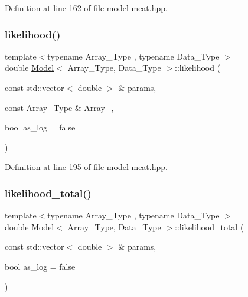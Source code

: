 Definition at line 162 of file model-\/meat.\+hpp.

\mbox{\label{class_model_adf2c30d9c5ffdc87af6813d110146968}} 
\subsubsection{\texorpdfstring{likelihood()}{likelihood()}\hspace{0.1cm}{\footnotesize\ttfamily [2/2]}}
{\footnotesize\ttfamily template$<$typename Array\+\_\+\+Type , typename Data\+\_\+\+Type $>$ \\
double \hyperlink{class_model}{Model}$<$ Array\+\_\+\+Type, Data\+\_\+\+Type $>$\+::likelihood (\begin{DoxyParamCaption}\item[{const std\+::vector$<$ double $>$ \&}]{params,  }\item[{const Array\+\_\+\+Type \&}]{Array\+\_\+,  }\item[{bool}]{as\+\_\+log = {\ttfamily false} }\end{DoxyParamCaption})\hspace{0.3cm}{\ttfamily [inline]}}



Definition at line 195 of file model-\/meat.\+hpp.

\mbox{\label{class_model_a2fe9cf412c5b2323c35c18952f9cb09d}} 
\subsubsection{\texorpdfstring{likelihood\+\_\+total()}{likelihood\_total()}}
{\footnotesize\ttfamily template$<$typename Array\+\_\+\+Type , typename Data\+\_\+\+Type $>$ \\
double \hyperlink{class_model}{Model}$<$ Array\+\_\+\+Type, Data\+\_\+\+Type $>$\+::likelihood\+\_\+total (\begin{DoxyParamCaption}\item[{const std\+::vector$<$ double $>$ \&}]{params,  }\item[{bool}]{as\+\_\+log = {\ttfamily false} }\end{DoxyParamCaption})\hspace{0.3cm}{\ttfamily [inline]}}



